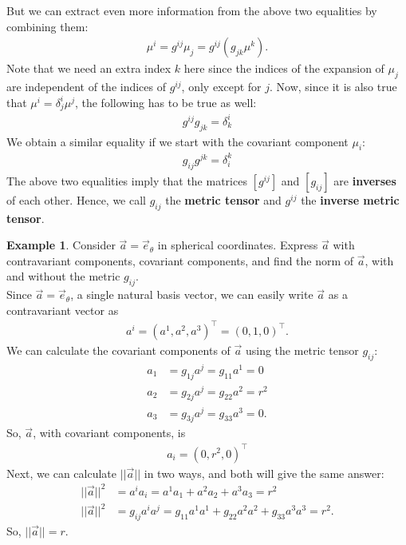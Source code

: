 \documentclass{book}
\theoremstyle{definition}
\newtheorem{exmp}{Example}[section]
\begin{document}
But we can extract even more information from the above two equalities by combining them:
\begin{align*}
\mu^i = g^{ij}\mu_j = g^{ij}\left(g_{jk}\mu^k\right). 
\end{align*}
Note that we need an extra index $k$ here since the indices of the expansion of $\mu_j$ are independent of the indices of $g^{ij}$, only except for $j$. Now, since it is also true that $\mu^i = \delta^i_j\mu^j$, the following has to be true as well:
\begin{align*}
\boxed{g^{ij}g_{jk} = \delta^i_k}
\end{align*}
We obtain a similar equality if we start with the covariant component $\mu_i$:
\begin{align*}
\boxed{g_{ij}g^{jk} = \delta^k_i}
\end{align*}
The above two equalities imply that the matrices $[g^{ij}]$ and $[g_{ij}]$ are \textbf{inverses} of each other. Hence, we call $g_{ij}$ the \textbf{metric tensor} and $g^{ij}$ the \textbf{inverse metric tensor}. 
\begin{exmp}
Consider $\vec{a} = \vec{e}_\theta$ in spherical coordinates. Express $\vec{a}$ with contravariant components, covariant components, and find the norm of $\vec{a}$, with and without the metric $g_{ij}$.\\

Since $\vec{a} = \vec{e}_\theta$, a single natural basis vector, we can easily write $\vec{a}$ as a contravariant vector as 
\begin{align*}
a^i = (a^1, a^2, a^3)^\top = (0,1,0)^\top. 
\end{align*}
We can calculate the covariant components of $\vec{a}$ using the metric tensor $g_{ij}$:
\begin{align*}
a_1 &= g_{1j}a^j = g_{11}a^1 = 0\\
a_2 &= g_{2j}a^j = g_{22}a^2 = r^2\\
a_3 &= g_{3j}a^j = g_{33}a^3 = 0.
\end{align*}
So, $\vec{a}$, with covariant components, is
\begin{align*}
a_i = (0, r^2, 0)^\top
\end{align*}
Next, we can calculate $\vert\vert \vec{a} \vert\vert$ in two ways, and both will give the same answer:
\begin{align*}
\vert\vert \vec{a} \vert\vert^2 &= a^ia_i = a^1a_1 + a^2a_2+a^3a_3 = r^2\\
\vert\vert \vec{a} \vert\vert^2 &= g_{ij}a^ia^j = g_{11}a^1a^1 +g_{22}a^2a^2 + g_{33}a^3a^3 = r^2.
\end{align*}
So, $\vert\vert \vec{a} \vert\vert  = r$.

\end{exmp}
\end{document}
